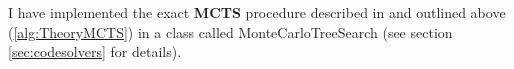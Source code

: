 \noindent I have implemented the exact \textbf{MCTS} procedure described in \cite{https://doi.org/10.48550/arxiv.1805.07470} and outlined above (\ref{alg:TheoryMCTS}) in a class called MonteCarloTreeSearch (see section \ref{sec:codesolvers} for details).




































